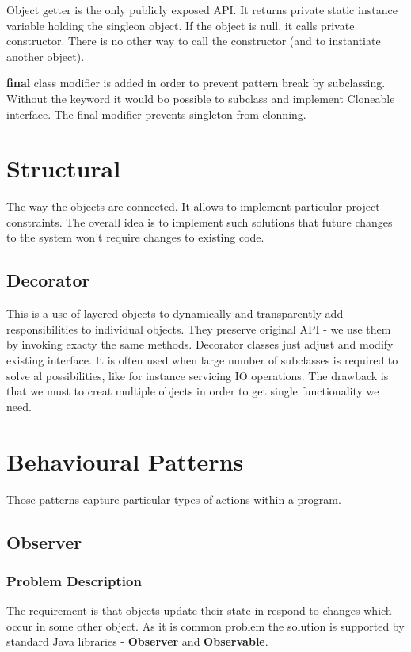 \documentclass{report}
\begin{document}
Object getter is the only publicly exposed API. It returns private static instance variable holding the singleon object. If the object is null, it calls private constructor. There is no other way to call the constructor (and to instantiate another object).

\textbf{final} class modifier is added in order to prevent pattern break by subclassing. Without the keyword it would bo possible to subclass and implement Cloneable interface.
The final modifier prevents singleton from clonning.



\part{Structural}
The way the objects are connected. It allows to implement particular project constraints. The overall idea is to implement such solutions
that future changes to the system won't require changes to existing code.


\chapter{Decorator}
This is a use of layered objects to dynamically and transparently add responsibilities to individual objects. They preserve
original API - we use them by invoking exacty the same methods. Decorator classes just adjust and modify existing interface.
It is often used when large number of subclasses is required to solve al possibilities, like for instance servicing IO
operations. The drawback is that we must to creat multiple objects in order to get single functionality we need.




\part{Behavioural Patterns}
Those patterns capture particular types of actions within a program.



\chapter{Observer}


\section{Problem Description}
The requirement is that objects update their state in respond to changes which occur in some other object. As it is common problem
the solution is supported by standard Java libraries - \textbf{Observer} and \textbf{Observable}.
\end{document}
